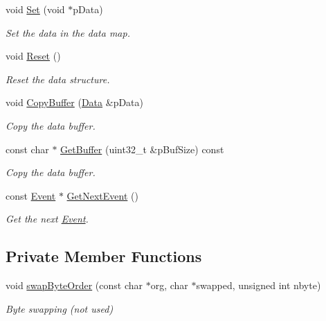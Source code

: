\begin{DoxyCompactItemize}
void \hyperlink{class_ph2___hw_interface_1_1_data_aec509baa349ed8a038797b63df76b3d9}{Set} (void $\ast$p\-Data)
\begin{DoxyCompactList}\small\item\em Set the data in the data map. \end{DoxyCompactList}\item 
void \hyperlink{class_ph2___hw_interface_1_1_data_ab33619d62d7662d11cf6c2bddebcc835}{Reset} ()
\begin{DoxyCompactList}\small\item\em Reset the data structure. \end{DoxyCompactList}\item 
void \hyperlink{class_ph2___hw_interface_1_1_data_a751235bbc2393f58f9fd83b8837ad2b4}{Copy\-Buffer} (\hyperlink{class_ph2___hw_interface_1_1_data}{Data} \&p\-Data)
\begin{DoxyCompactList}\small\item\em Copy the data buffer. \end{DoxyCompactList}\item 
const char $\ast$ \hyperlink{class_ph2___hw_interface_1_1_data_a6093f26d20db6ca6a2a248b6bc8ddb25}{Get\-Buffer} (uint32\-\_\-t \&p\-Buf\-Size) const 
\begin{DoxyCompactList}\small\item\em Copy the data buffer. \end{DoxyCompactList}\item 
const \hyperlink{class_ph2___hw_interface_1_1_event}{Event} $\ast$ \hyperlink{class_ph2___hw_interface_1_1_data_a18d1e30edd97079893bbd2332809cba8}{Get\-Next\-Event} ()
\begin{DoxyCompactList}\small\item\em Get the next \hyperlink{class_ph2___hw_interface_1_1_event}{Event}. \end{DoxyCompactList}\end{DoxyCompactItemize}
\subsection*{Private Member Functions}
\begin{DoxyCompactItemize}
\item 
void \hyperlink{class_ph2___hw_interface_1_1_data_a91b7bafc8b47251b022aab16e19fa722}{swap\-Byte\-Order} (const char $\ast$org, char $\ast$swapped, unsigned int nbyte)
\begin{DoxyCompactList}\small\item\em Byte swapping (not used) \end{DoxyCompactList}\end{DoxyCompactItemize}
